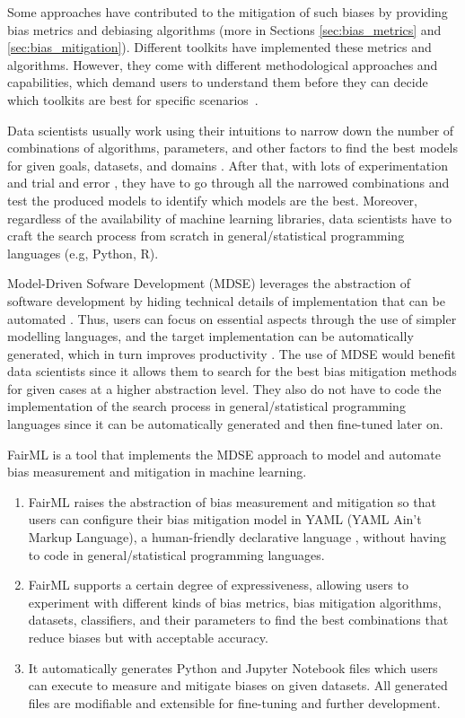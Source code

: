 \documentclass[sigconf,review]{acmart}
\begin{document}
	Some approaches have contributed to the mitigation of such biases by providing bias metrics and debiasing algorithms (more in Sections \ref{sec:bias_metrics} and \ref{sec:bias_mitigation}). 
	Different toolkits have implemented these metrics and algorithms.
	However, they come with different methodological approaches and capabilities, which demand users to understand them before they can decide which toolkits are best for specific scenarios~\cite{lee2021landscape}.  
	
	Data scientists usually work using their intuitions to narrow down the number of combinations of algorithms, parameters, and other factors to find the best models for given goals, datasets, and domains \cite{muller2016introduction}. After that, with lots of experimentation and trial and error \cite{byrne2017development}, they have to go through all the narrowed combinations and test the produced models to identify which models are the best. Moreover, regardless of the availability of machine learning libraries, data scientists have to craft the search process from scratch in general/statistical programming languages (e.g, Python, R).
	
	Model-Driven Sofware Development (MDSE) leverages the abstraction of software development by hiding technical details of implementation that can be automated \cite{brambilla2017model}. Thus, users can focus on essential aspects through the use of simpler modelling languages, and the target implementation can be automatically generated, which in turn improves productivity \cite{volter2013model}. The use of MDSE would benefit data scientists since it allows them to search for the best bias mitigation methods for given cases at a higher abstraction level. They also do not have to code the implementation of the search process in general/statistical programming languages since it can be automatically generated and then fine-tuned later on. 
	
	FairML is a tool that implements the MDSE approach to model and automate bias measurement and mitigation in machine learning. 
	\begin{enumerate}
		\item FairML raises the abstraction of bias measurement and mitigation so that users can configure their bias mitigation model in YAML (YAML Ain't Markup Language), a human-friendly declarative language \cite{evans2017yaml}, without having to code in general/statistical programming languages.
		\item FairML supports a certain degree of expressiveness, allowing users to experiment with different kinds of bias metrics, bias mitigation algorithms, datasets, classifiers, and their parameters to find the best combinations that reduce biases but with acceptable accuracy.
		\item It automatically generates Python and Jupyter Notebook files which users can execute to measure and mitigate biases on given datasets. All generated files are modifiable and extensible for fine-tuning and further development.
	\end{enumerate}
	
\end{document}
